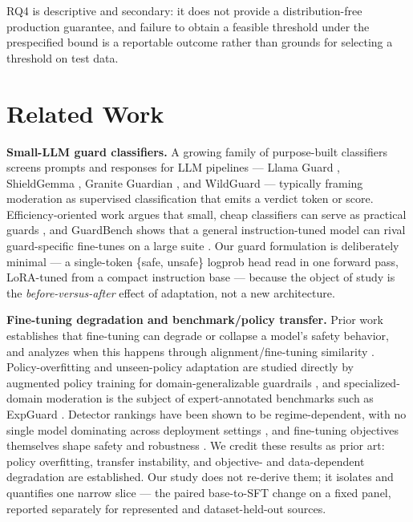 \documentclass[sigconf,nonacm]{acmart}
\begin{document}
RQ4 is descriptive and secondary: it does not provide a distribution-free production guarantee, and failure to obtain a feasible threshold under the prespecified bound is a reportable outcome rather than grounds for selecting a threshold on test data.

\section{Related Work}
\label{sec:related}

\textbf{Small-LLM guard classifiers.} A growing family of purpose-built classifiers screens prompts and responses for LLM pipelines --- Llama Guard \cite{inan2023llamaguard,meta2024llamaguard3_1b}, ShieldGemma \cite{zeng2024shieldgemma}, Granite Guardian \cite{padhi2024graniteguardian}, and WildGuard \cite{han2024wildguard} --- typically framing moderation as supervised classification that emits a verdict token or score. Efficiency-oriented work argues that small, cheap classifiers can serve as practical guards \cite{majhi2025gpuguard}, and GuardBench shows that a general instruction-tuned model can rival guard-specific fine-tunes on a large suite \cite{bassani2024guardbench}. Our guard formulation is deliberately minimal --- a single-token \{safe, unsafe\} logprob head read in one forward pass, LoRA-tuned from a compact instruction base \cite{bakouch2025smollm3,hu2021lora} --- because the object of study is the \emph{before-versus-after} effect of adaptation, not a new architecture.

\textbf{Fine-tuning degradation and benchmark/policy transfer.} Prior work establishes that fine-tuning can degrade or collapse a model's safety behavior, and analyzes when this happens through alignment/fine-tuning similarity \cite{hsiung2025guardrails}. Policy-overfitting and unseen-policy adaptation are studied directly by augmented policy training for domain-generalizable guardrails \cite{liu2026domaingeneralizable}, and specialized-domain moderation is the subject of expert-annotated benchmarks such as ExpGuard \cite{expguard2026}. Detector rankings have been shown to be regime-dependent, with no single model dominating across deployment settings \cite{akinrele2026regime}, and fine-tuning objectives themselves shape safety and robustness \cite{vennemeyer2026objective}. We credit these results as prior art: policy overfitting, transfer instability, and objective- and data-dependent degradation are established. Our study does not re-derive them; it isolates and quantifies one narrow slice --- the paired base-to-SFT change on a fixed panel, reported separately for represented and dataset-held-out sources.
\end{document}
